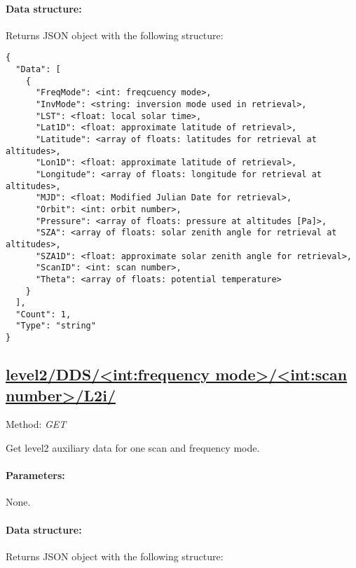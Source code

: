 \paragraph{Data structure:}
Returns JSON object with the following structure:

\begin{lstlisting}[basicstyle=\footnotesize]
{
  "Data": [
    {
      "FreqMode": <int: freqcuency mode>,
      "InvMode": <string: inversion mode used in retrieval>,
      "LST": <float: local solar time>,
      "Lat1D": <float: approximate latitude of retrieval>,
      "Latitude": <array of floats: latitudes for retrieval at altitudes>,
      "Lon1D": <float: approximate latitude of retrieval>,
      "Longitude": <array of floats: longitude for retrieval at altitudes>,
      "MJD": <float: Modified Julian Date for retrieval>,
      "Orbit": <int: orbit number>,
      "Pressure": <array of floats: pressure at altitudes [Pa]>,
      "SZA": <array of floats: solar zenith angle for retrieval at altitudes>,
      "SZA1D": <float: approximate solar zenith angle for retrieval>,
      "ScanID": <int: scan number>,
      "Theta": <array of floats: potential temperature>
    }
  ],
  "Count": 1,
  "Type": "string"
}
\end{lstlisting}


\subsection{\url{level2/DDS/<int:frequency mode>/<int:scan number>/L2i/}}
Method: \emph{GET}

Get level2 auxiliary data for one scan and frequency mode.

\paragraph{Parameters:} None.

\paragraph{Data structure:}
Returns JSON object with the following structure:

